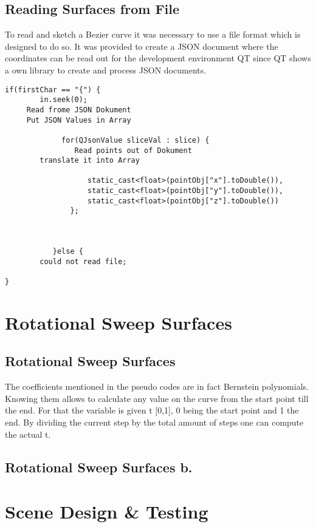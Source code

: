 \documentclass[11.5pt,oneside,a4paper]{scrartcl}
\newcounter{ct}
\begin{document}
\subsection{Reading Surfaces from File}
To read and sketch a Bezier curve it was necessary to use a file format which is designed to do so. It was provided to create a JSON document where the coordinates can be read out for the development environment QT since QT shows a own library to create and process JSON documents.
\\
\begin {lstlisting}
if(firstChar == "{") {
        in.seek(0);
     Read frome JSON Dokument 
     Put JSON Values in Array 

             for(QJsonValue sliceVal : slice) {
                Read points out of Dokument 
        translate it into Array

                   static_cast<float>(pointObj["x"].toDouble()),
                   static_cast<float>(pointObj["y"].toDouble()),
                   static_cast<float>(pointObj["z"].toDouble())
               };

 
             
           }else {
        could not read file;

}

\end{lstlisting}

\section{Rotational Sweep Surfaces}
\subsection {Rotational Sweep Surfaces}

The coefficients mentioned in the pseudo codes are in fact Bernstein polynomials. Knowing them allows to calculate any value on the curve from the start point till the end. For that the variable is given t [0,1], 0 being the start point and 1 the end. By dividing the current step by the total amount of steps one can compute the actual t.


\subsection {Rotational Sweep Surfaces b.}

\section{Scene Design \& Testing}
\end{document}
